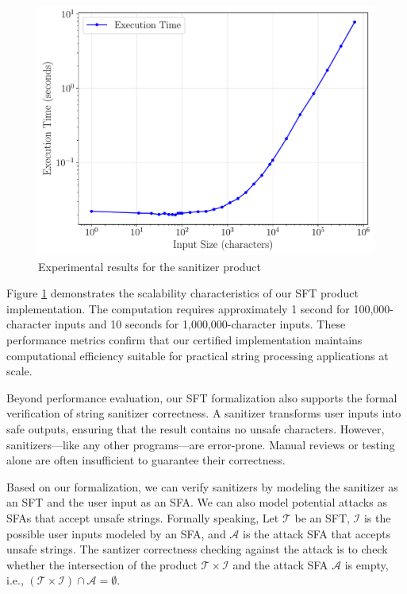 \begin{figure}
\centering
\includegraphics[scale=0.45]{benchmark_loglog.pdf}
\caption{Experimental results for the sanitizer product}
\label{fig:benchmark-results}
\end{figure}

Figure \ref{fig:benchmark-results} demonstrates the scalability characteristics of our SFT product implementation. The computation requires approximately 1 second for 100,000-character inputs and 10 seconds for 1,000,000-character inputs. These performance metrics confirm that our certified implementation maintains computational efficiency suitable for practical string processing applications at scale.

Beyond performance evaluation, our SFT formalization also supports the formal verification of string sanitizer correctness. A sanitizer transforms user inputs into safe outputs, ensuring that the result contains no unsafe characters. However, sanitizers—like any other programs—are error-prone. Manual reviews or testing alone are often insufficient to guarantee their correctness.

Based on our formalization, we can verify sanitizers by modeling the sanitizer as an SFT and the user input as an SFA. We can also model potential attacks as SFAs that accept unsafe strings. Formally speaking, Let $\mathcal{T}$ be an SFT, $\mathcal{I}$ is the possible user inputs modeled by an SFA, and $\mathcal{A}$ is the attack SFA that accepts unsafe strings. The santizer correctness checking against the attack is to check whether the intersection of the product $\mathcal{T} \times \mathcal{I}$ and the attack SFA $\mathcal{A}$ is empty, i.e., $(\mathcal{T} \times \mathcal{I}) \cap \mathcal{A} = \emptyset$.

